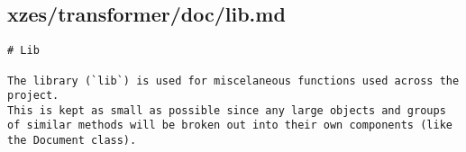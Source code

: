 \subsection{xzes/transformer/doc/lib.md}
\begin{lstlisting}[caption={Documentation about the general purpose library code.}]
# Lib

The library (`lib`) is used for miscelaneous functions used across the project.
This is kept as small as possible since any large objects and groups of similar methods will be broken out into their own components (like the Document class).
\end{lstlisting}
